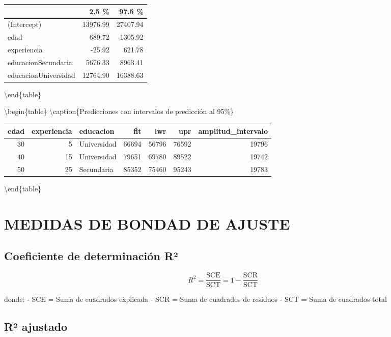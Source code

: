 \documentclass[
  oneside]{book}
\begin{document}
\begin{tabular}[t]{l|r|r}
\hline
  & 2.5 \% & 97.5 \%\\
\hline
(Intercept) & 13976.99 & 27407.94\\
\hline
edad & 689.72 & 1305.92\\
\hline
experiencia & -25.92 & 621.78\\
\hline
educacionSecundaria & 5676.33 & 8963.41\\
\hline
educacionUniversidad & 12764.90 & 16388.63\\
\hline
\end{tabular}

\textbackslash end\{table\}

\textbackslash begin\{table\}
\centering
\textbackslash caption\{\label{tab:intervalos}Predicciones con intervalos de predicción al 95\%\}
\centering

\begin{tabular}[t]{r|r|l|r|r|r|r}
\hline
edad & experiencia & educacion & fit & lwr & upr & amplitud\_intervalo\\
\hline
30 & 5 & Universidad & 66694 & 56796 & 76592 & 19796\\
\hline
40 & 15 & Universidad & 79651 & 69780 & 89522 & 19742\\
\hline
50 & 25 & Secundaria & 85352 & 75460 & 95243 & 19783\\
\hline
\end{tabular}

\textbackslash end\{table\}

\section{MEDIDAS DE BONDAD DE AJUSTE}\label{medidas-de-bondad-de-ajuste}

\subsection{Coeficiente de determinación R²}\label{coeficiente-de-determinaciuxf3n-ruxb2}

\begin{equation}
R^2 = \frac{\text{SCE}}{\text{SCT}} = 1 - \frac{\text{SCR}}{\text{SCT}}
\end{equation}

donde:
- SCE = Suma de cuadrados explicada
- SCR = Suma de cuadrados de residuos
- SCT = Suma de cuadrados total

\subsection{R² ajustado}\label{ruxb2-ajustado}
\end{document}
